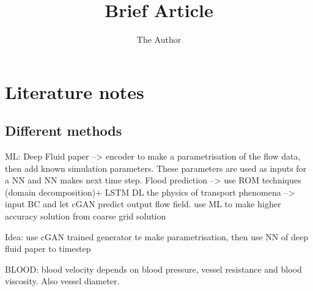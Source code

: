 \documentclass[11pt, oneside]{article}   	%
\title{Brief Article}
\author{The Author}
\begin{document}
\maketitle
\section{Literature notes}
\subsection{Different methods}
ML:
Deep Fluid paper --> encoder to make a parametrisation of the flow data, then add known simulation parameters. These parameters are used as inputs for a NN and NN makes next time step. 
Flood prediction --> use ROM techniques (domain decomposition)+  LSTM
DL the physics of transport phenomena --> input BC and let cGAN predict output flow field. 
use ML to make higher accuracy solution from coarse grid solution 

Idea: use cGAN trained generator te make parametrisation, then use NN of deep fluid paper to timestep

BLOOD:
blood velocity depends on blood pressure, vessel resistance and blood viscosity. Also vessel diameter.
\end{document}

